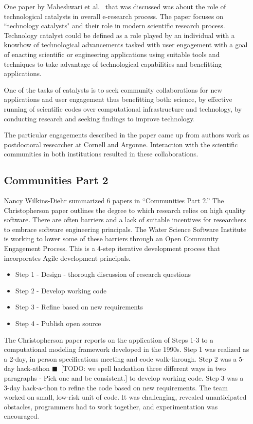 \documentclass[11pt, oneside]{amsart}
\newcommand{\todo}[1]{{\color{blue}$\blacksquare$~\textsf{[TODO: #1]}}}
\begin{document}
One paper by Maheshwari et al.~\cite{Maheshwari_WSSSPE} that was
discussed was about the role of technological catalysts in overall e-research
process.  The paper focuses on ``technology catalysts" and their role in modern
scientific research process. Technology catalyst could be defined as a role
played by an individual with a knowhow of technological advancements tasked
with user engagement with a goal of enacting scientific or engineering
applications using suitable tools and techniques to take advantage of
technological capabilities and benefitting applications.

One of the tasks of catalysts is to seek community collaborations for new
applications and user engagement thus benefitting both: science, by effective
running of scientific codes over computational infrastructure and technology,
by conducting research and seeking findings to improve technology. 

The particular engagements described in the paper came up from authors work as
postdoctoral researcher at Cornell and Argonne. Interaction with the scientific
communities in both institutions resulted in these collaborations.


\subsection{Communities Part 2}

Nancy Wilkins-Diehr summarized 6 papers in ``Communities Part 2.'' The Christopherson paper outlines the degree to which research
relies on high quality software. There are often barriers and a lack of suitable incentives for researchers to embrace software engineering principals.
The Water Science Software Institute is working to lower some of these barriers through an Open Community Engagement Process.
This is a 4-step iterative development process that incorporates Agile development principals.

\begin{itemize}

\item Step 1 - Design - thorough discussion of research questions
\item Step 2 - Develop working code
\item Step 3 - Refine based on new requirements
\item Step 4 - Publish open source

\end{itemize}

The Christopherson paper reports on the application of Steps 1-3 to a computational modeling framework developed in the 1990s.
Step 1 was realized as a 2-day, in person specifications meeting and code walk-through. Step 2 was a 5-day hack-athon \todo{we spell hackathon three different ways in two paragraphs - Pick one and be consistent.} to develop working code.
Step 3 was a 3-day hack-a-thon to refine the code based on new requirements. The team worked on small, low-risk unit of
code. It was challenging, revealed unanticipated obstacles, programmers had to work together, and experimentation was encouraged.
\end{document}
